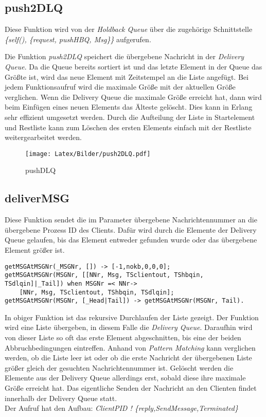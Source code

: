 \subsection{push2DLQ}

Diese Funktion wird von der \textit{Holdback Queue} über die zugehörige Schnittstelle \textit{\{self(), \{request, pushHBQ, Msg\}\}} aufgerufen.

Die Funktion \textit{push2DLQ} speichert die übergebene Nachricht in der \textit{Delivery Queue}. Da die Queue bereits sortiert ist und das letzte Element in der Queue das Größte ist, wird das neue Element mit Zeitstempel an die Liste angefügt. 
Bei jedem Funktionsaufruf wird die maximale Größe mit der aktuellen Größe verglichen. Wenn die Delivery Queue die maximale Größe erreicht hat, dann wird beim Einfügen eines neuen Elements das Älteste gelöscht. Dies kann in Erlang sehr effizient umgesetzt werden. Durch die Aufteilung der Liste in Startelement und Restliste kann zum Löschen des ersten Elements einfach mit der Restliste weitergearbeitet werden. 

\begin{figure}[htbp]
\begin{center}
\texttt{[image: Latex/Bilder/push2DLQ.pdf]}
\caption{pushDLQ}\label{fig:pushDLQ}
\end{center}
\end{figure}

\subsection{deliverMSG}

Diese Funktion sendet die im Parameter übergebene Nachrichtennummer an die übergebene Prozess ID des Clients. Dafür wird durch die Elemente der Delivery Queue gelaufen, bis das Element entweder gefunden wurde oder das übergebene Element größer ist. 

\begin{lstlisting}
getMSGAtMSGNr(_MSGNr, []) -> [-1,nokb,0,0,0];
getMSGAtMSGNr(MSGNr, [[NNr, Msg, TSclientout, TShbqin, TSdlqin]|_Tail]) when MSGNr =< NNr-> 
    [NNr, Msg, TSclientout, TShbqin, TSdlqin];
getMSGAtMSGNr(MSGNr, [_Head|Tail]) -> getMSGAtMSGNr(MSGNr, Tail).
\end{lstlisting}

In obiger Funktion ist das rekursive Durchlaufen der Liste gezeigt. Der Funktion wird eine Liste übergeben, in diesem Falle die \textit{Delivery Queue}. Daraufhin wird von dieser Liste so oft das erste Element abgeschnitten, bis eine der beiden Abbruchbedingungen eintreffen. Anhand von \textit{Pattern Matching} kann verglichen werden, ob die Liste leer ist oder ob die erste Nachricht der übergebenen Liste größer gleich der gesuchten Nachrichtennummer ist.
Gelöscht werden die Elemente aus der Delivery Queue allerdings erst, sobald diese ihre maximale Größe erreicht hat.
Das eigentliche Senden der Nachricht an den Clienten findet innerhalb der Delivery Queue statt. \\Der Aufruf hat den Aufbau:
\textit{ClientPID ! \{reply,SendMessage,Terminated\}}

